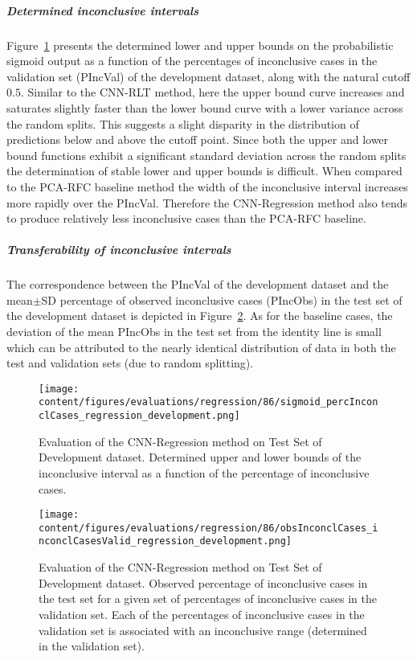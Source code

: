 \subparagraph{Determined inconclusive intervals}

Figure~\ref{fig:regression_percInconclCases_development} presents the determined lower and upper bounds on the 
probabilistic sigmoid output as a function of the percentages of inconclusive cases 
in the validation set (PIncVal) of the development dataset, along with the natural cutoff $0.5$.
Similar to the CNN-RLT method, 
here the upper bound curve increases and saturates slightly faster than the lower bound curve with a lower variance across 
the random splits.
This suggests a slight disparity in the distribution of predictions below and above the cutoff point.
Since both the upper and lower bound functions exhibit a significant standard deviation across the random splits 
the determination of stable lower and upper bounds is difficult.
When compared to the PCA-RFC baseline method 
the width of the inconclusive interval increases more rapidly over the PIncVal.
Therefore the CNN-Regression method also tends to produce relatively less inconclusive cases than the PCA-RFC baseline.


\subparagraph{Transferability of inconclusive intervals}

The correspondence between the PIncVal of the development dataset 
and the mean$\pm$SD percentage of observed inconclusive cases (PIncObs) in the test set of the development dataset 
is depicted in Figure~\ref{fig:obsInconclCases_inconclCasesValid_regression_development}.
As for the baseline cases, the deviation of the mean PIncObs in the test set from the 
identity line is small which can be attributed to the nearly identical distribution of data in both the test and validation sets 
(due to random splitting).

\begin{figure}[ht]
  \centering
  \texttt{[image: content/figures/evaluations/regression/86/sigmoid\_percInconclCases\_regression\_development.png]}
  \caption{Evaluation of the CNN-Regression method on Test Set of Development dataset. 
  Determined upper and lower bounds of the inconclusive interval as a function of the percentage of inconclusive cases.} 
  \label{fig:regression_percInconclCases_development}
\end{figure}


\begin{figure}[ht]
  \centering
  \texttt{[image: content/figures/evaluations/regression/86/obsInconclCases\_inconclCasesValid\_regression\_development.png]}
  \caption{Evaluation of the CNN-Regression method on Test Set of Development dataset.
  Observed percentage of inconclusive cases in the test set 
  for a given set of percentages of inconclusive cases in the validation set.
  Each of the percentages of inconclusive cases in the validation set is associated 
  with an inconclusive range (determined in the validation set).} 
  \label{fig:obsInconclCases_inconclCasesValid_regression_development}
\end{figure} 


